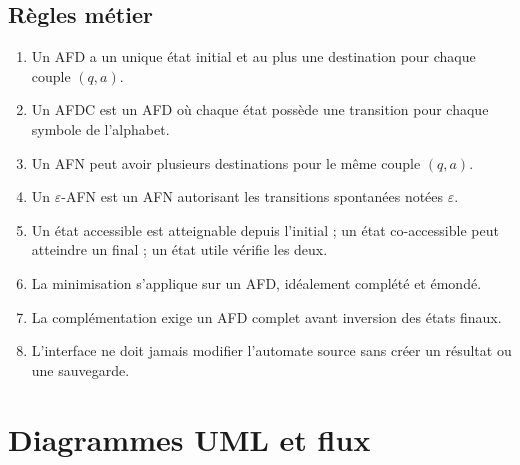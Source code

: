 \documentclass[11pt,a4paper]{report}
\newcommand{\eps}{\ensuremath{\varepsilon}}
\begin{document}
\section{Règles métier}
\begin{enumerate}
  \item Un AFD a un unique état initial et au plus une destination pour chaque couple $(q,a)$.
  \item Un AFDC est un AFD où chaque état possède une transition pour chaque symbole de l'alphabet.
  \item Un AFN peut avoir plusieurs destinations pour le même couple $(q,a)$.
  \item Un \eps-AFN est un AFN autorisant les transitions spontanées notées \eps.
  \item Un état accessible est atteignable depuis l'initial ; un état co-accessible peut atteindre un final ; un état utile vérifie les deux.
  \item La minimisation s'applique sur un AFD, idéalement complété et émondé.
  \item La complémentation exige un AFD complet avant inversion des états finaux.
  \item L'interface ne doit jamais modifier l'automate source sans créer un résultat ou une sauvegarde.
\end{enumerate}

\chapter{Diagrammes UML et flux}
\end{document}
